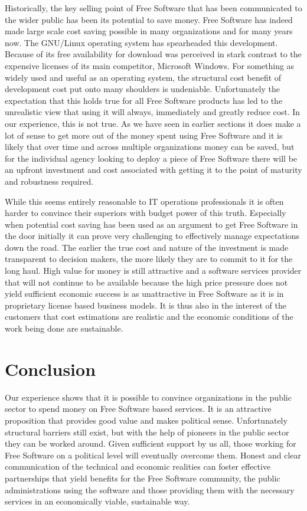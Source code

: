 Historically, the key selling point of Free Software that has been communicated
to the wider public has been its potential to save money.
Free Software has indeed made large scale cost
saving possible in many organizations and for many years now. 
The GNU/Linux operating system has spearheaded this development.
Because of its free availability for download was perceived in stark contrast 
to the expensive licenses of its main competitor, Microsoft Windows.
For something as
widely used and useful as an operating system, the structural cost benefit of
development cost put onto many shoulders is undeniable.  Unfortunately the
expectation that this holds true for all Free Software products has led to the
unrealistic view that using it will always, immediately and greatly reduce
cost. In our experience, this is not true. As we have seen in earlier sections
it does make a lot of sense to get more out of the money spent using Free
Software and it is likely that over time and across multiple organizations
money can be saved, but for the individual agency looking to deploy a piece of
Free Software there will be an upfront investment and cost associated with
getting it to the point of maturity and robustness required.

While this seems entirely reasonable to IT operations
professionals it is often harder to convince their superiors with budget power
of this truth. Especially when potential cost saving has been used as an
argument to get Free Software in the door initially it can prove very
challenging to effectively manage expectations down the road. The earlier the
true cost and nature of the investment is made transparent to decision makers,
the more likely they are to commit to it for the long haul. 
High value for money is still attractive and a software services provider that will
not continue to be available because the high price pressure does not yield
sufficient economic success is as unattractive in Free Software as it is in
proprietary license based business models. It is thus also in the interest of the
customers that cost estimations are realistic and the economic conditions of the
work being done are sustainable.

\section*{Conclusion}

Our experience shows that it is possible to convince organizations in
the public sector to spend money on Free Software based services. It is
an attractive proposition that provides good value and makes political
sense. Unfortunately structural barriers still exist, but with the help
of pioneers in the public sector they can be worked around. Given
sufficient support by us all, those working for Free Software on a political
level will eventually overcome them. Honest and clear
communication of the technical and economic realities can foster
effective partnerships that yield benefits for the Free Software community,
the public administrations using the software and those providing them
with the necessary services in an economically viable, sustainable way.

